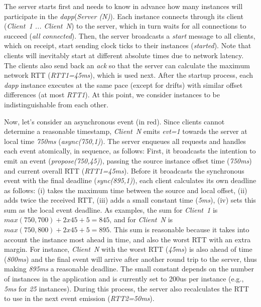 \documentclass[sigplan,screen]{acmart}
\newcommand{\dapp}{\emph{dapp}\xspace}
\begin{document}
The server starts first and needs to know in advance how many instances will
participate in the \dapp (\emph{Server (N)}).
Each instance connects through its client (\emph{Client~1 ... Client~N}) to the
server, which in turn waits for all connections to succeed
(\emph{all connected}).
Then, the server broadcasts a \emph{start} message to all clients, which on
receipt, start sending clock ticks to their instances (\emph{started}).
Note that clients will inevitably start at different absolute times due to
network latency.
The clients also send back an \emph{ack} so that the server can calculate the
maximum network RTT (\emph{RTT1=45ms}), which is used next.
%
After the startup process, each \dapp instance executes at the same pace
(except for drifts) with similar offset differences (at most \emph{RTT1}).
At this point, we consider instances to be indistinguishable from each other.

Now, let's consider an asynchronous event (in red).
%
Since clients cannot determine a reasonable timestamp, \emph{Client~N} emits
\emph{evt=1} towards the server at local time \emph{750ms}
(\emph{async(750,1)}).
%
The server enqueues all requests and handles each event atomically, in
sequence, as follows:
%
First, it broadcasts the intention to emit an event (\emph{propose(750,45)}),
passing the source instance offset time (\emph{750ms}) and current overall RTT
(\emph{RTT1=45ms}).
Before it broadcasts the synchronous event with the final deadline
(\emph{sync(895,1)}), each client calculates its own deadline as follows:
    (i)   takes the maximum time between the source and local offset,
    (ii)  adds twice the received RTT,
    (iii) adds a small constant time (\emph{5ms}),
    (iv)  sets this sum as the local event deadline.
As examples, the sum for
    \emph{Client~1} is $max(750,700)+2x45+5=845$, and for
    \emph{Client~N} is $max(750,800)+2x45+5=895$.
%
This sum is reasonable because it takes into account
    the instance most ahead in time, and also
    the worst RTT with an extra margin.
For instance, \emph{Client~N} with the worst RTT (\emph{45ms}) is also ahead of
time (\emph{800ms}) and the final event will arrive after another round trip to
the server, thus making \emph{895ms} a reasonable deadline.
%
The small constant depends on the number of instances in the application and is
currently set to 200us per instance (e.g., \emph{5ms} for \emph{25} instances).
%
During this process, the server also recalculates the RTT to use in the next
event emission (\emph{RTT2=50ms}).
\end{document}
